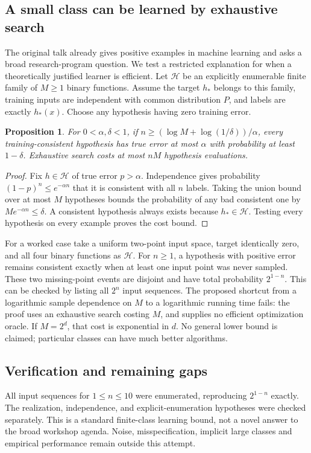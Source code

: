 \documentclass[11pt]{article}
\newtheorem{proposition}{Proposition}
\begin{document}
\subsection{A small class can be learned by exhaustive search}
The original talk already gives positive examples in machine learning and asks a broad research-program question. We test a restricted explanation for when a theoretically justified learner is efficient. Let $\mathcal H$ be an explicitly enumerable finite family of $M\ge1$ binary functions. Assume the target $h_*$ belongs to this family, training inputs are independent with common distribution $P$, and labels are exactly $h_*(x)$. Choose any hypothesis having zero training error.
\begin{proposition}
For $0<\alpha,\delta<1$, if $n\ge(\log M+\log(1/\delta))/\alpha$, every training-consistent hypothesis has true error at most $\alpha$ with probability at least $1-\delta$. Exhaustive search costs at most $nM$ hypothesis evaluations.
\end{proposition}
\begin{proof}
Fix $h\in\mathcal H$ of true error $p>\alpha$. Independence gives probability $(1-p)^n\le e^{-\alpha n}$ that it is consistent with all $n$ labels. Taking the union bound over at most $M$ hypotheses bounds the probability of any bad consistent one by $Me^{-\alpha n}\le\delta$. A consistent hypothesis always exists because $h_*\in\mathcal H$. Testing every hypothesis on every example proves the cost bound.
\end{proof}
For a worked case take a uniform two-point input space, target identically zero, and all four binary functions as $\mathcal H$. For $n\ge1$, a hypothesis with positive error remains consistent exactly when at least one input point was never sampled. These two missing-point events are disjoint and have total probability $2^{1-n}$. This can be checked by listing all $2^n$ input sequences.
The proposed shortcut from a logarithmic sample dependence on $M$ to a logarithmic running time fails: the proof uses an exhaustive search costing $M$, and supplies no efficient optimization oracle. If $M=2^d$, that cost is exponential in $d$. No general lower bound is claimed; particular classes can have much better algorithms.
\subsection{Verification and remaining gaps}
All input sequences for $1\le n\le10$ were enumerated, reproducing $2^{1-n}$ exactly. The realization, independence, and explicit-enumeration hypotheses were checked separately. This is a standard finite-class learning bound, not a novel answer to the broad workshop agenda. Noise, misspecification, implicit large classes and empirical performance remain outside this attempt.
\end{document}
